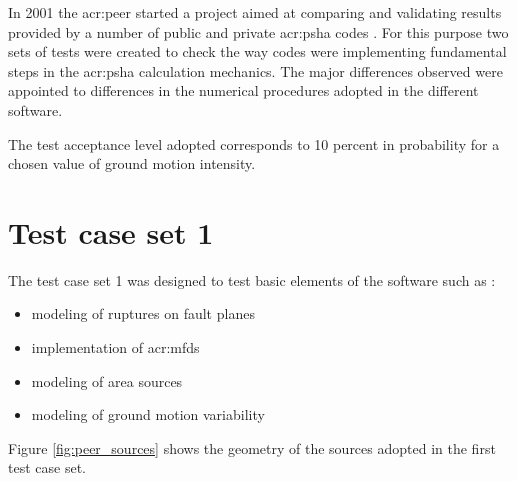 %
In 2001 the \gls{acr:peer} started a project aimed at comparing and validating
results provided by a number of public and private 
\gls{acr:psha} codes \parencite[for a comprehensive list see][]{thomas2010}.
%
For this purpose two sets of tests were created to check the way 
codes were implementing fundamental steps in the \gls{acr:psha}
calculation mechanics.
%
The major differences observed were appointed to differences in 
the numerical procedures adopted in the different software.

The test acceptance level adopted corresponds to 10 percent in 
probability for a chosen value of ground motion intensity.
%
\section{Test case set 1}
The test case set 1 was designed to test basic elements of the 
software such as \parencite{thomas2010}:
\begin{itemize}
\item modeling of ruptures on fault planes 
\item implementation of \glspl{acr:mfd}
\item modeling of area sources
\item modeling of ground motion variability
\end{itemize}
Figure \ref{fig:peer_sources} shows the geometry of the sources adopted 
in the first test case set. 
